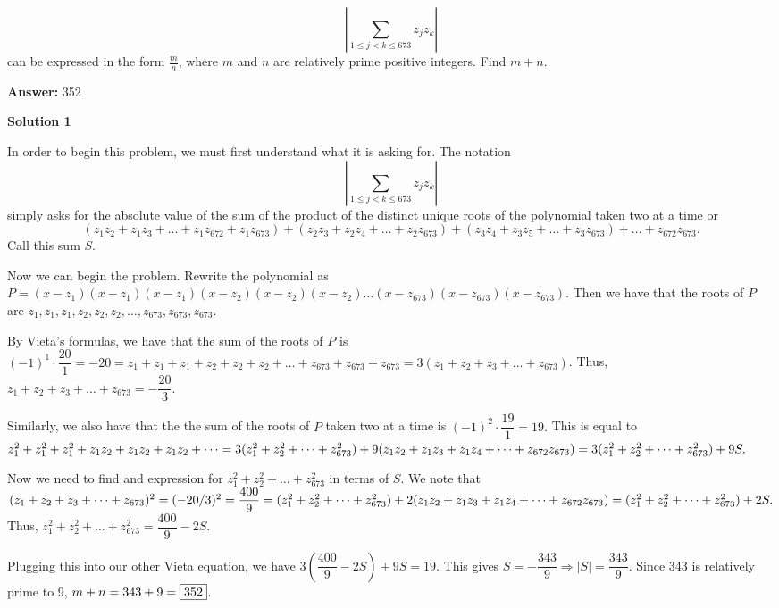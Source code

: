 \begin{enumerate}
 \[\left| \sum_{1 \le j <k \le 673} z_jz_k \right|\]
can be expressed in the form $\frac{m}{n}$, where $m$ and $n$ are relatively prime positive integers. Find $m+n$.


 
 \textbf{Answer: }352



\textbf{Solution 1}

In order to begin this problem, we must first understand what it is asking for. The notation 
 \[\left| \sum_{1 \le j <k \le 673} z_jz_k \right|\]simply asks for the absolute value of the sum of the product of the distinct unique roots of the polynomial taken two at a time or
 \[(z_1z_2+z_1z_3+ \dots + z_1z_{672}+z_1z_{673})+(z_2z_3+z_2z_4+ \dots +z_2z_{673}) + (z_3z_4+z_3z_5+ \dots +z_3z_{673}) + \dots +z_{672}z_{673}.\] Call this sum $S$. 

 Now we can begin the problem. Rewrite the polynomial as $P=(x-z_1)(x-z_1)(x-z_1)(x-z_2)(x-z_2)(x-z_2) \dots (x-z_{673})(x-z_{673})(x-z_{673})$. Then we have that the roots of $P$ are $z_1,z_1,z_1,z_2,z_2,z_2, \dots , z_{673},z_{673},z_{673}$. 

 By Vieta's formulas, we have that the sum of the roots of $P$ is $(-1)^1 \cdot \dfrac{20}{1}=-20=z_1+z_1+z_1+z_2+z_2+z_2+ \dots + z_{673}+z_{673}+z_{673}=3(z_1+z_2+z_3+ \dots +z_{673})$. Thus, $z_1+z_2+z_3+ \dots +z_{673}=- \dfrac{20}{3}.$ 

 Similarly, we also have that the the sum of the roots of $P$ taken two at a time is $(-1)^2 \cdot \dfrac{19}{1} = 19.$ This is equal to $z_1^2+z_1^2+z_1^2+z_1z_2+z_1z_2+z_1z_2+ \dots =  \\ 3(z_1^2+z_2^2+ \dots + z_{673}^2) + 9(z_1z_2+z_1z_3+z_1z_4+ \dots + z_{672}z_{673}) =  3(z_1^2+z_2^2+ \dots + z_{673}^2) + 9S.$ 

 Now we need to find and expression for $z_1^2+z_2^2+ \dots + z_{673}^2$ in terms of $S$. We note that $(z_1+z_2+z_3+ \dots +z_{673})^2= (-20/3)^2=\dfrac{400}{9} \\ =(z_1^2+z_2^2+ \dots + z_{673}^2)+2(z_1z_2+z_1z_3+z_1z_4+ \dots + z_{672}z_{673})=(z_1^2+z_2^2+ \dots + z_{673}^2)+2S.$ Thus, $z_1^2+z_2^2+ \dots + z_{673}^2= \dfrac{400}{9} -2S$. 

 Plugging this into our other Vieta equation, we have $3 \left( \dfrac{400}{9} -2S \right) +9S = 19$. This gives $S = - \dfrac{343}{9} \Rightarrow \left| S \right| = \dfrac{343}{9}$. Since 343 is relatively prime to 9, $m+n = 343+9 = \fbox{352}$.

 




\end{enumerate}
